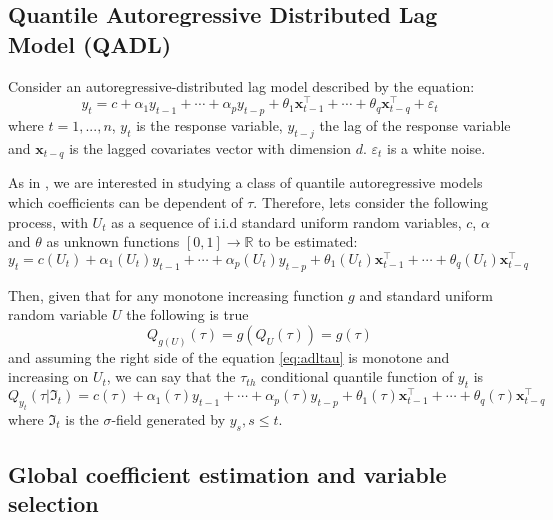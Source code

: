 \documentclass[aoas]{imsart}
\numberwithin{equation}{section}
\theoremstyle{plain}
\theoremstyle{remark}
\begin{document}
\hypertarget{quantile-autoregressive-distributed-lag-model-qadl}{%
\subsection{Quantile Autoregressive Distributed Lag Model
(QADL)}\label{quantile-autoregressive-distributed-lag-model-qadl}}

Consider an autoregressive-distributed lag model described by the
equation: \begin{equation}
y_t = c + \alpha_1y_{t-1} +  \cdots + \alpha_py_{t-p} + \theta_1\mathbf{x}_{t-1}^\intercal + \cdots + \theta_q\mathbf{x}_{t-q}^\intercal + \varepsilon_t 
\label{eq:adl}
\end{equation} where \(t = 1, ..., n\), \(y_t\) is the response
variable, \(y_{t-j}\) the lag of the response variable and
\(\mathbf{x}_{t-q}\) is the lagged covariates vector with dimension
\(d\). \(\varepsilon_t\) is a white noise.

As in \citet{Koenker2006}, we are interested in studying a class of
quantile autoregressive models which coefficients can be dependent of
\(\tau\). Therefore, lets consider the following process, with \({U_t}\)
as a sequence of i.i.d standard uniform random variables, \(c\),
\(\alpha\) and \(\theta\) as unknown functions
\([0,1] \rightarrow \mathbb{R}\) to be estimated: \begin{equation}
y_t = c(U_t) + \alpha_1(U_t)y_{t-1} +  \cdots + \alpha_p(U_t)y_{t-p} + \theta_1(U_t)\mathbf{x}_{t-1}^\intercal + \cdots + \theta_q(U_t)\mathbf{x}_{t-q}^\intercal
\label{eq:adltau}
\end{equation}

Then, given that for any monotone increasing function \(g\) and standard
uniform random variable \(U\) the following is true \[
Q_{g(U)}(\tau) = g(Q_U(\tau)) = g(\tau)
\] and assuming the right side of the equation \ref{eq:adltau} is
monotone and increasing on \(U_t\), we can say that the \(\tau_{th}\)
conditional quantile function of \(y_t\) is \begin{equation}
Q_{y_t}(\tau|\Im_t) =  c(\tau) + \alpha_1(\tau)y_{t-1} + \cdots + \alpha_p(\tau)y_{t-p} + \theta_1(\tau)\mathbf{x}_{t-1}^\intercal + \cdots + \theta_q(\tau)\mathbf{x}_{t-q}^\intercal
\label{eq:qadl}
\end{equation} where \(\Im_t\) is the \(\sigma\)-field generated by
\({y_s, s\leq t}\).

\hypertarget{global-coefficient-estimation-and-variable-selection}{%
\subsection{Global coefficient estimation and variable
selection}\label{global-coefficient-estimation-and-variable-selection}}
\end{document}
